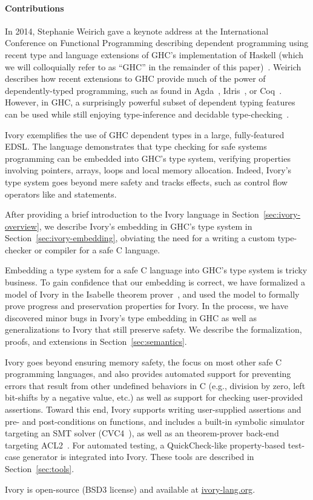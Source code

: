 
\paragraph{Contributions}
In 2014, Stephanie Weirich gave a keynote address at the International
Conference on Functional Programming describing dependent programming using
recent type and language extensions of GHC's implementation of Haskell (which we
will colloquially refer to as ``GHC'' in the remainder of this
paper)~\cite{weirich-keynote}. Weirich describes how recent extensions to GHC
provide much of the power of dependently-typed programming, such as found in
Agda~\cite{agda}, Idris~\cite{idris}, or Coq~\cite{coq}. However, in GHC, a surprisingly
powerful subset of dependent typing features can be used while still enjoying
type-inference and decidable type-checking~\cite{dephaskell}.

Ivory exemplifies the use of GHC dependent types in a large, fully-featured
EDSL. The language demonstrates that type checking for safe systems programming
can be embedded into GHC's type system, verifying properties involving
pointers, arrays, loops and local memory allocation. Indeed, Ivory's type
system goes beyond mere safety and tracks effects, such as control flow
operators like  and  statements.

After providing a brief introduction to the Ivory language in
Section~\ref{sec:ivory-overview}, we describe Ivory's embedding in GHC's type
system in Section~\ref{sec:ivory-embedding}, obviating the need for a writing a
custom type-checker or compiler for a safe C language.

Embedding a type system for a safe C language into GHC's type system is tricky
business. To gain confidence that our embedding is correct, we have formalized a
model of Ivory in the Isabelle theorem prover~\cite{isabelle}, and used the model to
formally prove progress and preservation properties for Ivory. In the process,
we have discovered minor bugs in Ivory's type embedding in GHC as well as
generalizations to Ivory that still preserve safety. We describe the
formalization, proofs, and extensions in Section~\ref{sec:semantics}.

Ivory goes beyond ensuring memory safety, the focus on most other safe C
programming languages, and also provides automated support for preventing errors
that result from other undefined behaviors in C (e.g., division by zero, left
bit-shifts by a negative value, etc.) as well as support for checking
user-provided assertions. Toward this end, Ivory supports writing user-supplied
assertions and pre- and post-conditions on functions, and includes a built-in
symbolic simulator targeting an SMT solver (CVC4~\cite{cvc4}), as well as an
theorem-prover back-end targeting ACL2~\cite{acl2}. For automated testing, a
QuickCheck-like property-based test-case generator is integrated into
Ivory. These tools are described in Section~\ref{sec:tools}.

Ivory is open-source (BSD3 license) and available at \url{ivory-lang.org}. 

